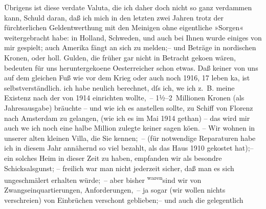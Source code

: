 \pstart
           Übrigens ist  diese verda{\geminationm}te Valuta, die ich daher doch nicht so ganz verdammen
               kann, \introOben{}Schuld daran\introOben{}, daß ich mich in den letzten zwei Jahren
               trotz der fürchterlichen Geldentwerthung mit den Meinigen ohne eigentliche »Sorgen«
               weitergebracht habe: in Holland, Schweden, und auch bei Ihnen wurde einiges von
               mir gespielt; auch Amerika fängt an sich zu
               melden;– und  Beträge in nordischen Kronen, oder holl. Gulden, die früher gar nicht in Betracht geko{\geminationm}en {\pb}wären, bedeuten
               für uns heruntergeko{\geminationm}ene Oesterreicher schon etwas. Daß keiner von uns auf dem gleichen
               Fuß wie vor dem Krieg oder auch noch 1916, 17 leben ka{\geminationn}, ist selbstverständlich. ich habe neulich berechnet,
               dſs ich, we{\geminationn} ich z. B. meine Existenz nach  der von 1914 einrichten wollte, –
               1½–2 Millionen Kronen \introOben{}(als Jahresausgabe)\introOben{} bräuchte – und wie
               ich es anstellen sollte, zu Schiff von Florenz
               nach Amsterdam zu gelangen, (wie ich es im
                  Mai 1914 gethan) – das wird mir \introOben{}auch we{\geminationn} ich noch eine halbe Million zulegte\introOben{} keiner
               sagen kö{\geminationn}en. – Wir wohnen  in unserer alten kleinen Villa, die Sie kennen; – (für notwendige
               Reparaturen habe ich in diesem Jahr annähernd so viel bezahlt, als das Haus
                  1910 gekostet hat);– ein solches Heim in dieser Zeit \introOben{}zu\introOben{} haben, empfanden wir als besondre Schicksalsgunst; –
               freilich  war man nicht jederzeit sicher, daß
               man es sich unge{\pb}schmälert erhalten würde; – aber
               bisher \substVorne{}\textsuperscript{waren}\substDazwischen{}sind\substHinten{} wir von Zwangseinquartierungen, Anforderungen, – ja sogar (wir wollen nichts
               verschreien) von Einbrüchen verschont geblieben;– und auch die gelegentlich
